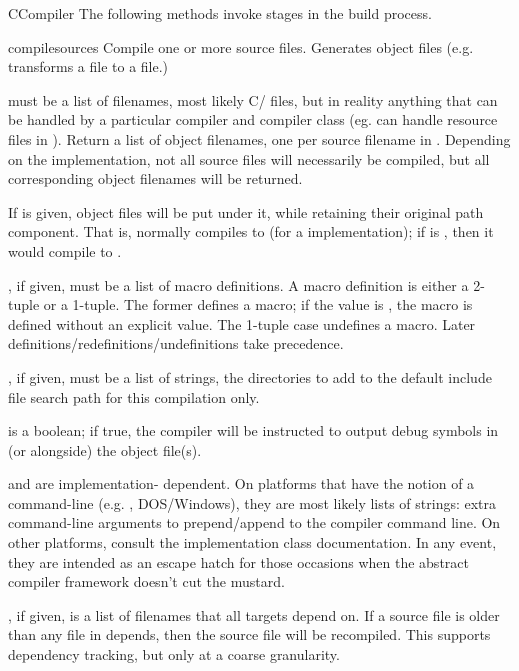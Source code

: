 \documentclass{manual}
\begin{document}
\begin{classdesc}{CCompiler}{}
The following methods invoke stages in the build process.

\begin{methoddesc}{compile}{sources}
Compile one or more source files. Generates object files (e.g. 
transforms a  file to a  file.)

 must be a list of filenames, most likely C/\Cpp
files, but in reality anything that can be handled by a
particular compiler and compiler class (eg.  can
handle resource files in ).  Return a list of object
filenames, one per source filename in .  Depending on
the implementation, not all source files will necessarily be
compiled, but all corresponding object filenames will be
returned.

If  is given, object files will be put under it, while
retaining their original path component.  That is, 
normally compiles to  (for a \UNIX{} implementation); if
 is , then it would compile to
.

, if given, must be a list of macro definitions.  A macro
definition is either a  2-tuple or a  1-tuple.
The former defines a macro; if the value is , the macro is
defined without an explicit value.  The 1-tuple case undefines a
macro.  Later definitions/redefinitions/undefinitions take
precedence.

, if given, must be a list of strings, the
directories to add to the default include file search path for this
compilation only.

 is a boolean; if true, the compiler will be instructed to
output debug symbols in (or alongside) the object file(s).

 and  are implementation- dependent.
On platforms that have the notion of a command-line (e.g. \UNIX,
DOS/Windows), they are most likely lists of strings: extra
command-line arguments to prepend/append to the compiler command
line.  On other platforms, consult the implementation class
documentation.  In any event, they are intended as an escape hatch
for those occasions when the abstract compiler framework doesn't
cut the mustard.

, if given, is a list of filenames that all targets
depend on.  If a source file is older than any file in
depends, then the source file will be recompiled.  This
supports dependency tracking, but only at a coarse
granularity.


\end{methoddesc}
\end{classdesc}
\end{document}

